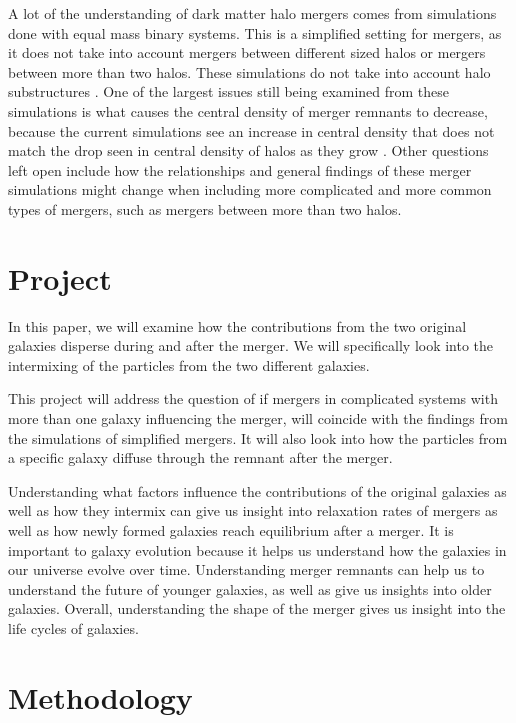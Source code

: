 \documentclass[linenumbers,trackchanges,twocolumn]{aastex7}
\begin{document}
A lot of the understanding of dark matter halo mergers comes from simulations done with equal mass binary systems. This is a simplified setting for mergers, as it does not take into account mergers between different sized halos or mergers between more than two halos. These simulations do not take into account halo substructures \cite{2019MNRAS.487..993D}. One of the largest issues still being examined from these simulations is what causes the central density of merger remnants to decrease, because the current simulations see an increase in central density that does not match the drop seen in central density of halos as they grow \cite{2019MNRAS.487.1008D}. Other questions left open include how the relationships and general findings of these merger simulations might change when including more complicated and more common types of mergers, such as mergers between more than two halos. 


\section{Project} \label{sec:style}

In this paper, we will examine how the contributions from the two original galaxies disperse during and after the merger. We will specifically look into the intermixing of the particles from the two different galaxies. 

This project will address the question of if mergers in complicated systems with more than one galaxy influencing the merger, will coincide with the findings from the simulations of simplified mergers. It will also look into how the particles from a specific galaxy diffuse through the remnant after the merger. 

Understanding what factors influence the contributions of the original galaxies as well as how they intermix can give us insight into relaxation rates of mergers as well as how newly formed galaxies reach equilibrium after a merger. It is important to galaxy evolution because it helps us understand how the galaxies in our universe evolve over time. Understanding merger remnants can help us to understand the future of younger galaxies, as well as give us insights into older galaxies. Overall, understanding the shape of the merger gives us insight into the life cycles of galaxies.

\section{Methodology} \label{sec:style}
\end{document}
